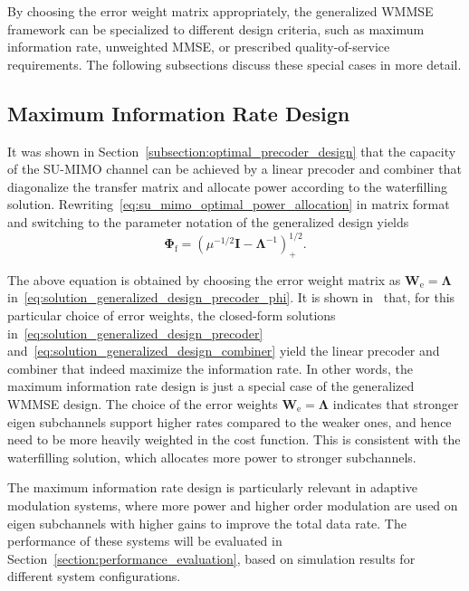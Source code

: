 By choosing the error weight matrix appropriately, the generalized \ac{WMMSE} framework can be specialized to different design criteria, such as maximum information rate, unweighted \ac{MMSE}, or prescribed quality-of-service requirements. The following subsections discuss these special cases in more detail.

\subsection{Maximum Information Rate Design}
\label{section:maximum_information_rate_design}

It was shown in Section~\ref{subsection:optimal_precoder_design} that the capacity of the \ac{SU}-\ac{MIMO} channel can be achieved by a linear precoder and combiner that diagonalize the transfer matrix and allocate power according to the waterfilling solution.
Rewriting~\eqref{eq:su_mimo_optimal_power_allocation} in matrix format and switching to the parameter notation of the generalized design yields~\cite{su_mimo_joint_precoder_decoder_design}
\begin{equation}
\label{eq:waterfilling_power_allocation_generalized_design}
    \mathbf{\Phi}_{\mathrm{f}} = (\mu^{-1/2} \mathbf{I} - \mathbf{\Lambda}^{-1})^{1/2}_{+}.
\end{equation}

The above equation is obtained by choosing the error weight matrix as $\mathbf{W}_{\mathrm{e}} = \mathbf{\Lambda}$ in~\eqref{eq:solution_generalized_design_precoder_phi}. 
It is shown in~\cite{su_mimo_joint_precoder_decoder_design} that, for this particular choice of error weights, the closed-form solutions in~\eqref{eq:solution_generalized_design_precoder} and~\eqref{eq:solution_generalized_design_combiner} yield the linear precoder and combiner that indeed maximize the information rate.
In other words, the maximum information rate design is just a special case of the generalized WMMSE design.
The choice of the error weights $\mathbf{W}_{\mathrm{e}} = \mathbf{\Lambda}$ indicates that stronger eigen subchannels support higher rates compared to the weaker ones, and hence need to be more heavily weighted in the cost function. This is consistent with the waterfilling solution, which allocates more power to stronger subchannels.

The maximum information rate design is particularly relevant in adaptive modulation systems, where more power and higher order modulation are used on eigen subchannels with higher gains to improve the total data rate.
The performance of these systems will be evaluated in Section~\ref{section:performance_evaluation}, based on simulation results for different system configurations.

